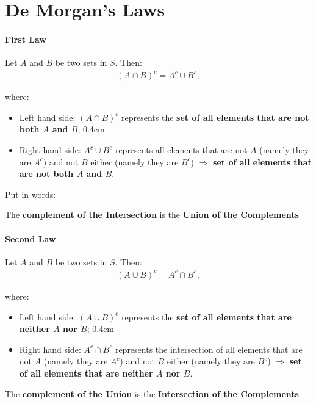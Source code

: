 \documentclass[notes=show]{beamer}\usepackage[]{graphicx}\usepackage[]{color}
\newcommand{\bea}{\begin{eqnarray}}
\newcommand{\eea}{\end{eqnarray}}
\newcommand{\nn}{\nonumber}
\begin{document}
\section{De Morgan’s Laws}

\begin{frame}{\secname}
\framesubtitle{First Law}
  Let $A$ and $B$ be two sets in $S$. Then:
  \bea
  (A\cap B)^{c} =A^c \cup B^c,  \nn
  \eea

  where: \vspace{0.4cm}

  \begin{itemize}
\item Left hand side: \color{blue}$(A\cap B)^{c}$ \color{black} represents the \textbf{set of all elements that are not both $A$ and $B$}; \vspace
{0.4cm}
\item Right hand side:  \color{blue}$A^c \cup B^c$ \color{black} represents all elements that are not $A$ (namely they are $A^c$) and not $B$ either (namely they are $B^c$) $\Rightarrow$ \textbf{set of all elements that are not both $A$ and $B$}.
\end{itemize}
Put in words:
\begin{center}
The \textbf{complement of the Intersection} is the \textbf{Union of the Complements}
\end{center}
\end{frame}

\begin{frame}{\secname}
\framesubtitle{Second Law}

Let $A$ and $B$ be two sets in $S$. Then:
\bea
(A\cup B)^{c} =A^c \cap B^c,  \nn
\eea

where: \vspace{0.4cm}

\begin{itemize}
\item Left hand side: \color{blue}$(A\cup B)^{c}$ \color{black} represents the \textbf{set of all elements that are neither $A$ nor $B$}; \vspace
{0.4cm}
\item Right hand side:  \color{blue}$A^c \cap B^c$ \color{black} represents the intersection of all elements that are not $A$ (namely they are $A^c$) and not $B
$ either (namely they are $B^c$) $\Rightarrow$ \textbf{set of all elements that are neither $A$ nor $B$}.
\end{itemize}
\begin{center}
The \textbf{complement of the Union} is the \textbf{Intersection of the Complements}
\end{center}
\end{frame}
\end{document}

